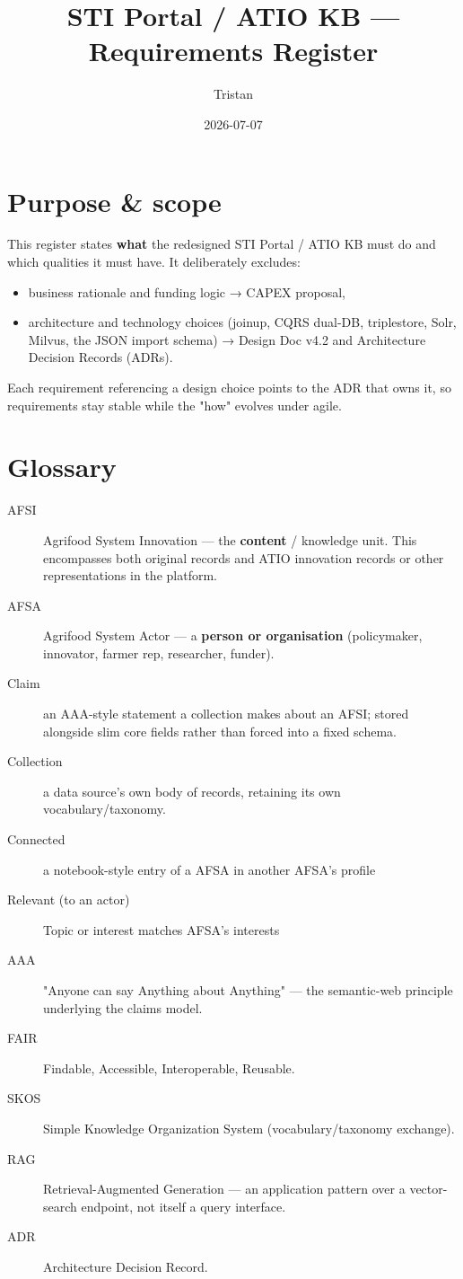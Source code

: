 \documentclass{scrartcl}
\author{Tristan}
\date{2026-07-07}
\title{STI Portal / ATIO KB — Requirements Register}
\begin{document}
\maketitle
\tableofcontents

\section{Purpose \& scope}
\label{sec:org108aeca}
This register states \textbf{what} the redesigned STI Portal / ATIO KB must do and which qualities it
must have. It deliberately excludes:
\begin{itemize}
\item business rationale and funding logic → CAPEX proposal,
\item architecture and technology choices (joinup, CQRS dual-DB, triplestore, Solr, Milvus, the JSON import schema) → Design Doc v4.2 and Architecture Decision Records (ADRs).
\end{itemize}
Each requirement referencing a design choice points to the ADR that owns it, so requirements stay stable while the "how" evolves under agile.
\section{Glossary}
\label{sec:orgda777e7}
\begin{description}
\item[{AFSI}] Agrifood System Innovation — the \textbf{content} / knowledge unit. This encompasses both original records and ATIO innovation records or other representations in the platform.
\item[{AFSA}] Agrifood System Actor — a \textbf{person or organisation} (policymaker, innovator, farmer rep, researcher, funder).
\item[{Claim}] an AAA-style statement a collection makes about an AFSI; stored alongside slim core
fields rather than forced into a fixed schema.
\item[{Collection}] a data source's own body of records, retaining its own vocabulary/taxonomy.
\item[{Connected}] a notebook-style entry of a AFSA in another AFSA's profile
\item[{Relevant (to an actor)}] Topic or interest matches AFSA's interests
\item[{AAA}] "Anyone can say Anything about Anything" — the semantic-web principle underlying the
claims model.
\item[{FAIR}] Findable, Accessible, Interoperable, Reusable.
\item[{SKOS}] Simple Knowledge Organization System (vocabulary/taxonomy exchange).
\item[{RAG}] Retrieval-Augmented Generation — an application pattern over a vector-search endpoint,
not itself a query interface.
\item[{ADR}] Architecture Decision Record.
\end{description}
\end{document}

